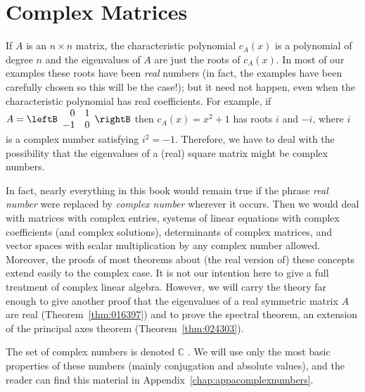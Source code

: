 \section{Complex Matrices}
\label{sec:8_6}

If $A$ is an $n \times n$ matrix, the characteristic polynomial $c_{A}(x)$ is a polynomial of degree $n$ and the eigenvalues of $A$ are just the roots of $c_{A}(x)$. In most of our examples these roots have been \textit{real} numbers (in fact, the examples have been carefully chosen so this will be the case!); but it need not happen, even when the characteristic polynomial has real coefficients. For example, if $A = \leftB \begin{array}{rr}
0 & 1 \\
-1 & 0
\end{array}\rightB$ then $c_{A}(x) = x^{2} + 1$ has roots $i$ and $-i$, where $i$ is a complex number satisfying $i^{2} = -1$. Therefore, we have to deal with the possibility that the eigenvalues of a (real) square matrix might be complex numbers.

In fact, nearly everything in this book would remain true if the phrase \textit{real number} were replaced by \textit{complex number}
 wherever it occurs. Then we would deal with matrices with complex 
entries, systems of linear equations with complex coefficients (and 
complex solutions), determinants of complex matrices, and vector spaces 
with scalar multiplication by any complex number allowed. Moreover, the 
proofs of most theorems about (the real version of) these concepts 
extend easily to the complex case. It is not our intention here to give a
 full treatment of complex linear algebra. However, we will carry the 
theory far enough to give another proof that the eigenvalues of a real 
symmetric matrix $A$ are real (Theorem~\ref{thm:016397}) and to prove the spectral theorem, an extension of the principal axes theorem (Theorem~\ref{thm:024303}).

The set of complex numbers is denoted $\mathbb{C}$ . We will use only the most basic properties of these numbers (mainly conjugation and absolute values), and the reader can find this material in Appendix~\ref{chap:appacomplexnumbers}.

